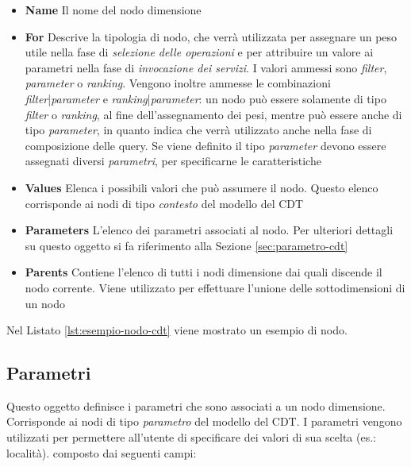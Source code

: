 \begin{itemize}
	\item \textbf{Name} Il nome del nodo dimensione
	\item \textbf{For} Descrive la tipologia di nodo, che verrà utilizzata per assegnare un peso utile nella fase di \emph{selezione delle operazioni} e per attribuire un valore ai parametri nella fase di \emph{invocazione dei servizi}. I valori ammessi sono \emph{filter}, \emph{parameter} o \emph{ranking}. Vengono inoltre ammesse le combinazioni \emph{filter}|\emph{parameter} e \emph{ranking}|\emph{parameter}: un nodo può essere solamente di tipo \emph{filter} o \emph{ranking}, al fine dell'assegnamento dei pesi, mentre può essere anche di tipo \emph{parameter}, in quanto indica che verrà utilizzato anche nella fase di composizione delle query. Se viene definito il tipo \emph{parameter} devono essere assegnati diversi \emph{parametri}, per specificarne le caratteristiche
	\item \textbf{Values} Elenca i possibili valori che può assumere il nodo. Questo elenco corrisponde ai nodi di tipo \emph{contesto} del modello del CDT
	\item \textbf{Parameters} L'elenco dei parametri associati al nodo. Per ulteriori dettagli su questo oggetto si fa riferimento alla Sezione \ref{sec:parametro-cdt}
	\item \textbf{Parents} Contiene l'elenco di tutti i nodi dimensione dai quali discende il nodo corrente. Viene utilizzato per effettuare l'unione delle sottodimensioni di un nodo
\end{itemize}

Nel Listato \ref{lst:esempio-nodo-cdt} viene mostrato un esempio di nodo.



\subsection{Parametri\label{sec:parametro-cdt}}

Questo oggetto definisce i parametri che sono associati a un nodo dimensione. Corrisponde ai nodi di tipo \emph{parametro} del modello del CDT. I parametri vengono utilizzati per permettere all'utente di specificare dei valori di sua scelta (es.: località). \upe composto dai seguenti campi:

